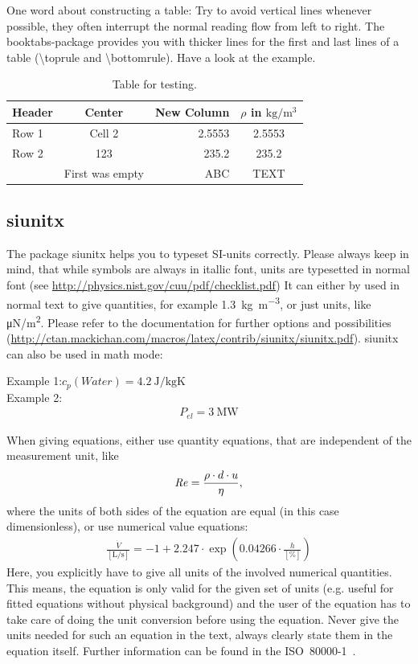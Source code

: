 One word about constructing a table: Try to avoid vertical lines whenever possible, they often interrupt the normal reading flow from left to right. The booktabs-package provides you with thicker lines for the first and last lines of a table (\textbackslash toprule and \textbackslash bottomrule). Have a look at the example.

\begin{table}
	\caption{Table for testing.}
	\label{Tab:TableTest}
	\centering
	\begin{tabular}{lcrS}
		\toprule
		Header		& Center			& New Column	& $\rho$ in $\si{\kg \per \meter^3}$ \\
		\midrule
		Row 1		& Cell 2			& 2.5553		& 2.5553 \\
		Row 2		& 123				& 235.2			& 235.2  \\
					& First was empty	& ABC			& {TEXT} \\
		\bottomrule
	\end{tabular}
\end{table}

\subsection{siunitx}
The package siunitx helps you to typeset SI-units correctly. Please always keep in mind, that while symbols are always in itallic font, units are typesetted in normal font (see \url{http://physics.nist.gov/cuu/pdf/checklist.pdf}) It can either by used in normal text to give quantities, for example \SI{1.3}{\kg \per \meter^3}, or just units, like \si{\micro \N / \square \meter}. Please refer to the documentation for further options and possibilities (\url{http://ctan.mackichan.com/macros/latex/contrib/siunitx/siunitx.pdf}). siunitx can also be used in math mode:

Example 1:\quad $c_{p}\left(Water\right) = \SI{4.2}{\J \per \kg \K}$\\
Example 2:
\begin{align}
	P_{el} = \SI{3}{\mega \watt}
\end{align}

When giving equations, either use quantity equations, that are independent of the measurement unit, like
\begin{align}
	\operatorname{\mathit{R\kern-.04em e}} = \frac{\rho \cdot d \cdot u}{\eta},
\end{align}
where the units of both sides of the equation are equal (in this case dimensionless), or use numerical value equations:
\begin{align}
	\frac{\dot{V}}
		 {\left[\si{\liter \per \second}\right]} 
		= -1 + 2.247 \cdot \exp{\left(
							0.04266\cdot
							\frac{h}{\left[ \% \right]}
							\right)}
\end{align}
Here, you explicitly have to give all units of the involved numerical quantities. This means, the equation is only valid for the given set of units (e.g. useful for fitted equations without physical background) and the user of the equation has to take care of doing the unit conversion before using the equation. Never give the units needed for such an equation in the text, always clearly state them in the equation itself. Further information can be found in the ISO~80000-1~\cite{ISO80000}.

